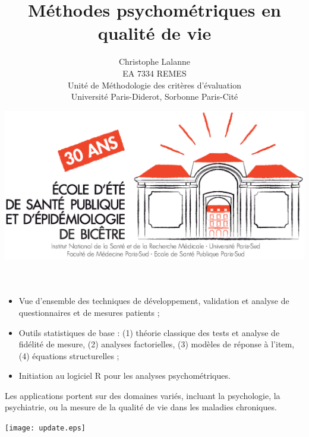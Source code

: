 

\title{Méthodes psychométriques en qualité de vie} 
\author{Christophe Lalanne\\EA 7334 REMES\\ Unité de Méthodologie des critères
  d’évaluation\\Université Paris-Diderot, Sorbonne Paris-Cité\\}
\date{\includegraphics[height=18ex]{logo.eps}}




\LogoOff
\maketitle
\rightfooter{\quad\textsf{\thepage}}




\begin{itemize}
\item Vue d'ensemble des techniques de développement, validation et analyse de
  questionnaires et de mesures patients ;
\item Outils statistiques de base : (1) théorie classique des tests et analyse
  de fidélité de mesure, (2) analyses factorielles, (3) modèles de réponse à
  l'item, (4) équations structurelles ;
\item Initiation au logiciel R pour les analyses psychométriques.
\end{itemize}

Les applications portent sur des domaines variés, incluant la psychologie, la
psychiatrie, ou la mesure de la qualité de vie dans les maladies chroniques.

\foilhead{}

{\centering \texttt{[image: update.eps]}\par}


